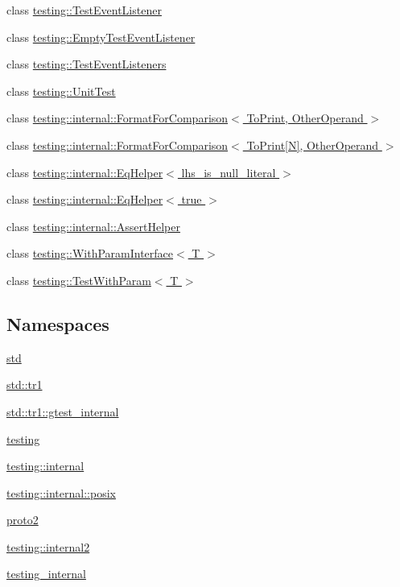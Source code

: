 \begin{DoxyCompactItemize}
class \hyperlink{classtesting_1_1_test_event_listener}{testing\-::\-Test\-Event\-Listener}
\item 
class \hyperlink{classtesting_1_1_empty_test_event_listener}{testing\-::\-Empty\-Test\-Event\-Listener}
\item 
class \hyperlink{classtesting_1_1_test_event_listeners}{testing\-::\-Test\-Event\-Listeners}
\item 
class \hyperlink{classtesting_1_1_unit_test}{testing\-::\-Unit\-Test}
\item 
class \hyperlink{classtesting_1_1internal_1_1_format_for_comparison}{testing\-::internal\-::\-Format\-For\-Comparison$<$ To\-Print, Other\-Operand $>$}
\item 
class \hyperlink{classtesting_1_1internal_1_1_format_for_comparison_3_01_to_print[_n]_00_01_other_operand_01_4}{testing\-::internal\-::\-Format\-For\-Comparison$<$ To\-Print\mbox{[}\-N\mbox{]}, Other\-Operand $>$}
\item 
class \hyperlink{classtesting_1_1internal_1_1_eq_helper}{testing\-::internal\-::\-Eq\-Helper$<$ lhs\-\_\-is\-\_\-null\-\_\-literal $>$}
\item 
class \hyperlink{classtesting_1_1internal_1_1_eq_helper_3_01true_01_4}{testing\-::internal\-::\-Eq\-Helper$<$ true $>$}
\item 
class \hyperlink{classtesting_1_1internal_1_1_assert_helper}{testing\-::internal\-::\-Assert\-Helper}
\item 
class \hyperlink{classtesting_1_1_with_param_interface}{testing\-::\-With\-Param\-Interface$<$ T $>$}
\item 
class \hyperlink{classtesting_1_1_test_with_param}{testing\-::\-Test\-With\-Param$<$ T $>$}
\end{DoxyCompactItemize}
\subsection*{Namespaces}
\begin{DoxyCompactItemize}
\item 
\hyperlink{namespacestd}{std}
\item 
\hyperlink{namespacestd_1_1tr1}{std\-::tr1}
\item 
\hyperlink{namespacestd_1_1tr1_1_1gtest__internal}{std\-::tr1\-::gtest\-\_\-internal}
\item 
\hyperlink{namespacetesting}{testing}
\item 
\hyperlink{namespacetesting_1_1internal}{testing\-::internal}
\item 
\hyperlink{namespacetesting_1_1internal_1_1posix}{testing\-::internal\-::posix}
\item 
\hyperlink{namespaceproto2}{proto2}
\item 
\hyperlink{namespacetesting_1_1internal2}{testing\-::internal2}
\item 
\hyperlink{namespacetesting__internal}{testing\-\_\-internal}
\end{DoxyCompactItemize}
